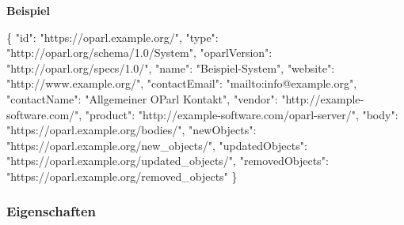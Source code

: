 \documentclass[,a4paper]{article}
\newenvironment{Shaded}{}{}
\newcommand{\DataTypeTok}[1]{\textcolor[rgb]{0.56,0.13,0.00}{{#1}}}
\newcommand{\StringTok}[1]{\textcolor[rgb]{0.25,0.44,0.63}{{#1}}}
\newcommand{\FunctionTok}[1]{\textcolor[rgb]{0.02,0.16,0.49}{{#1}}}
\begin{document}
\textbf{Beispiel}

\begin{Shaded}
\begin{Highlighting}[]
\FunctionTok{\{}
    \DataTypeTok{"id"}\FunctionTok{:} \StringTok{"https://oparl.example.org/"}\FunctionTok{,}
    \DataTypeTok{"type"}\FunctionTok{:} \StringTok{"http://oparl.org/schema/1.0/System"}\FunctionTok{,}
    \DataTypeTok{"oparlVersion"}\FunctionTok{:} \StringTok{"http://oparl.org/specs/1.0/"}\FunctionTok{,}
    \DataTypeTok{"name"}\FunctionTok{:} \StringTok{"Beispiel-System"}\FunctionTok{,}
    \DataTypeTok{"website"}\FunctionTok{:} \StringTok{"http://www.example.org/"}\FunctionTok{,}
    \DataTypeTok{"contactEmail"}\FunctionTok{:} \StringTok{"mailto:info@example.org"}\FunctionTok{,}
    \DataTypeTok{"contactName"}\FunctionTok{:} \StringTok{"Allgemeiner OParl Kontakt"}\FunctionTok{,}
    \DataTypeTok{"vendor"}\FunctionTok{:} \StringTok{"http://example-software.com/"}\FunctionTok{,}
    \DataTypeTok{"product"}\FunctionTok{:} \StringTok{"http://example-software.com/oparl-server/"}\FunctionTok{,}
    \DataTypeTok{"body"}\FunctionTok{:} \StringTok{"https://oparl.example.org/bodies/"}\FunctionTok{,}
    \DataTypeTok{"newObjects"}\FunctionTok{:} \StringTok{"https://oparl.example.org/new_objects/"}\FunctionTok{,}
    \DataTypeTok{"updatedObjects"}\FunctionTok{:} \StringTok{"https://oparl.example.org/updated_objects/"}\FunctionTok{,}
    \DataTypeTok{"removedObjects"}\FunctionTok{:} \StringTok{"https://oparl.example.org/removed_objects"}
\FunctionTok{\}}
\end{Highlighting}
\end{Shaded}

\subsubsection{Eigenschaften}\label{eigenschaften}
\end{document}
